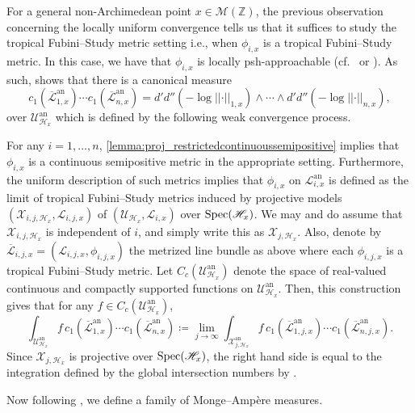 \documentclass[11pt,reqno]{amsart}
\newcommand{\mZ}{\mathbb{Z}}
\newcommand{\cX}{\mathcal{X}}
\newcommand{\cU}{\mathcal{U}}
\newcommand{\cL}{\mathcal{L}}
\newcommand{\nrm}[1]{\left|\left |#1\right |\right |}
\newcommand{\sH}{{\mathscr H}}
\newcommand{\sM}{{\mathscr M}}
\theoremstyle{theorem}
\numberwithin{equation}{subsection}
\numberwithin{equation}{subsection}
\theoremstyle{definition}
\theoremstyle{remark}
\numberwithin{equation}{subsubsection} \numberwithin{figure}{section}
\DeclareMathOperator{\an}{an}
\begin{document}
For a general non-Archimedean point $x\in \sM(\mZ)$,  the previous observation concerning the locally uniform convergence tells us that it suffices to study the tropical Fubini--Study metric setting i.e., when $\phi_{i,x}$ is a tropical Fubini--Study metric. 
In this case, we have that $\phi_{i,x}$ is locally psh-approachable (cf.~\cite[Corollaire 6.3.4]{ChambertLoirDucros:FormesDifferentielles} or \cite[Lemma 2.9]{BoucksomJonsson:SingularPSH}). 
As such,  \cite[Corollaire 5.6.5]{ChambertLoirDucros:FormesDifferentielles} shows that there is a canonical measure
\[
c_1(\overline{\cL}_{1,x}^{\an})\cdots c_1(\overline{\cL}_{n,x}^{\an}) = d'd''(-\log\nrm{\cdot}_{1,x})\wedge \cdots \wedge d'd''(-\log\nrm{\cdot}_{n,x}),
\]
over $\cU^{\an}_{\sH_x}$ which is defined by the following weak convergence process. 


For any $i = 1,\dots,n$,  \autoref{lemma:proj_restrictedcontinuoussemipositive} implies that $\phi_{i,x}$ is a continuous semipositive metric in the appropriate setting. 
Furthermore, the uniform description of such metrics implies that $\phi_{i,x}$ on $\cL_{i,x}^{\an}$ is defined as the limit of tropical Fubini--Study metrics induced by projective models $(\cX_{i,j,\sH_x},\cL_{i,j,x})$ of $(\cU_{\sH_x},\cL_{i,x})$ over $\Spec(\sH_x)$. 
We may and do assume that $\cX_{i,j,\sH_x}$ is independent of $i$, and simply write this as $\cX_{j,\sH_x}$. Also, denote by $\overline{\cL}_{i,j,x} = (\cL_{i,j,x},\phi_{i,j,x})$ the metrized line bundle as above where each $\phi_{i,j,x}$ is a tropical Fubini--Study metric. 
Let $C_c(\cU^{\an}_{\sH_x})$ denote the space of real-valued continuous and compactly supported functions on $\cU^{\an}_{\sH_x}$. 
Then, this construction gives that for any $f\in C_c(\cU^{\an}_{\sH_x})$,
\begin{equation}\label{eqn:MAmeasure}
\int_{\cU^{\an}_{\sH_x}} f\, c_1(\overline{\cL}^{\an}_{1,x})\cdots c_1(\overline{\cL}^{\an}_{n,x})\coloneqq \lim_{j\to \infty} \int_{\cX_{j,\sH_x}^{\an}} f\, c_1(\overline{\cL}_{1,j,x}^{\an})\cdots c_1(\overline{\cL}_{n,j,x}^{\an}). 
\end{equation}
Since $\cX_{j,\sH_x}$ is projective over $\Spec(\sH_x)$, the right hand side is equal to the integration defined by the global intersection numbers by \cite{ChambertLoirDucros:FormesDifferentielles}. 

Now following \cite{PilleSchneider:Global}, we define a family of Monge--Amp\`ere measures. 
\end{document}
